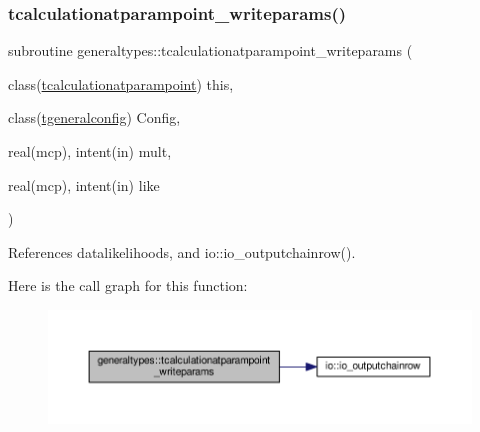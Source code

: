 \mbox{\label{namespacegeneraltypes_a2a8909b75d213ee335199e2fd1769711}} 
\subsubsection{\texorpdfstring{tcalculationatparampoint\+\_\+writeparams()}{tcalculationatparampoint\_writeparams()}}
{\footnotesize\ttfamily subroutine generaltypes\+::tcalculationatparampoint\+\_\+writeparams (\begin{DoxyParamCaption}\item[{class(\mbox{\hyperlink{structgeneraltypes_1_1tcalculationatparampoint}{tcalculationatparampoint}})}]{this,  }\item[{class(\mbox{\hyperlink{structgeneraltypes_1_1tgeneralconfig}{tgeneralconfig}})}]{Config,  }\item[{real(mcp), intent(in)}]{mult,  }\item[{real(mcp), intent(in)}]{like }\end{DoxyParamCaption})\hspace{0.3cm}{\ttfamily [private]}}



References datalikelihoods, and io\+::io\+\_\+outputchainrow().

Here is the call graph for this function\+:
\nopagebreak
\begin{figure}[H]
\begin{center}
\leavevmode
\includegraphics[width=350pt]{namespacegeneraltypes_a2a8909b75d213ee335199e2fd1769711_cgraph}
\end{center}
\end{figure}
\mbox{\label{namespacegeneraltypes_ad37138d6b09c9e6feda0357b1c94e85a}} 

